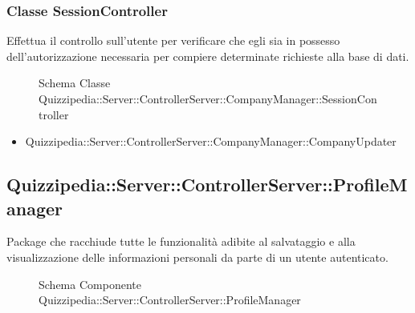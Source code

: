 \subsubsection{Classe SessionController}
Effettua il controllo sull'utente per verificare che egli sia in possesso dell'autorizzazione necessaria per compiere determinate richieste alla base di dati.
\begin{figure}[H]
\centering
\noindent{}
\caption[Schema Classe SessionController]{Schema Classe Quizzipedia::Server::ControllerServer::CompanyManager::SessionController}
\end{figure}
\begin{itemize}
\item Quizzipedia::Server::ControllerServer::CompanyManager::CompanyUpdater
\end{itemize}
\subsection{Quizzipedia::Server::ControllerServer::ProfileManager}
Package che racchiude tutte le funzionalità adibite al salvataggio e alla visualizzazione delle informazioni personali da parte di un utente autenticato.
\begin{figure}[H]
\centering
\noindent{}
\caption[Schema Componente Quizzipedia::Server::ControllerServer::ProfileManager]{Schema Componente Quizzipedia::Server::ControllerServer::ProfileManager}
\end{figure}
